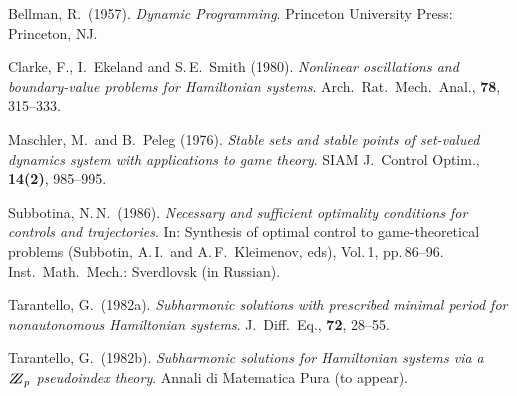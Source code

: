\documentclass[citeauthoryear]{GTM2020}
\begin{document}
\begin{thebibliography}{}

Bellman, R.\ (1957). {\em Dynamic Programming}.
Princeton University Press:  Princeton, NJ.

Clarke, F., I.\ Ekeland and S.\,E.\ Smith (1980).
{\em Nonlinear oscillations and boundary-value problems for
Hamiltonian systems}. Arch.\ Rat.\ Mech.\ Anal., {\bf 78}, 315--333.

Maschler, M.\ and B.\ Peleg (1976). {\em Stable sets and stable points of
set-valued dynamics system with applications to game theory}.
SIAM J.\ Control Optim., {\bf 14(2)}, 985--995.

Subbotina, N.\,N.\ (1986).
{\em Necessary and sufficient optimality conditions for controls and
trajectories}.
In: Synthesis of optimal control to game-theoretical problems
(Subbotin, A.\,I.\  and A.\,F.\ Kleimenov, eds), Vol.\,1, pp.\,86--96.
Inst.\ Math.\ Mech.: Sverdlovsk (in Russian).

Tarantello, G.\ (1982a).
{\em Subharmonic solutions with prescribed minimal
period for nonautonomous Hamiltonian systems}.
J.\ Diff.\ Eq., {\bf 72}, 28--55.

Tarantello, G.\ (1982b).
{\em Subharmonic solutions for Hamiltonian
systems via a $\bbbz_{p}$ pseudoindex theory}.
Annali di Matematica Pura (to appear).

\end{thebibliography}
\end{document}

